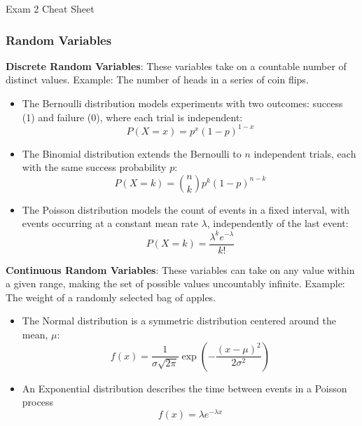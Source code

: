 \begin{cheatsheet}{Exam 2 Cheat Sheet}
    \small{
        \subsubsection*{Random Variables}

        \item \textbf{Discrete Random Variables}: These variables take on a countable number of distinct values. Example: The number of heads in a series of coin flips.
        \begin{itemize}
            \item The Bernoulli distribution models experiments with two outcomes: success (1) and failure (0), where each trial is independent:
            \begin{equation*}
                P(X = x) = p^x(1-p)^{1-x}
            \end{equation*}
            \item The Binomial distribution extends the Bernoulli to $n$ independent trials, each with the same success probability $p$:
            \begin{equation*}
                P(X = k) = \binom{n}{k} p^k(1-p)^{n-k}
            \end{equation*}
            \item The Poisson distribution models the count of events in a fixed interval, with events occurring at a constant mean rate $\lambda$, independently of the last event:
            \begin{equation*}
                P(X = k) = \frac{\lambda^k e^{-\lambda}}{k!}
            \end{equation*}
        \end{itemize}
        \item \textbf{Continuous Random Variables}: These variables can take on any value within a given range, making the set of possible values uncountably infinite. Example: The weight of a randomly 
        selected bag of apples.
        \begin{itemize}
            \item The Normal distribution is a symmetric distribution centered around the mean, $\mu$:
            \begin{equation*}
                f(x) = \frac{1}{\sigma\sqrt{2\pi}} \exp\left(-\frac{(x-\mu)^2}{2\sigma^2}\right)
            \end{equation*}
            \item An Exponential distribution describes the time between events in a Poisson process
            \begin{equation*}
                f(x) = \lambda e^{-\lambda x}
            \end{equation*}
        \end{itemize}
    
}
\end{cheatsheet}
